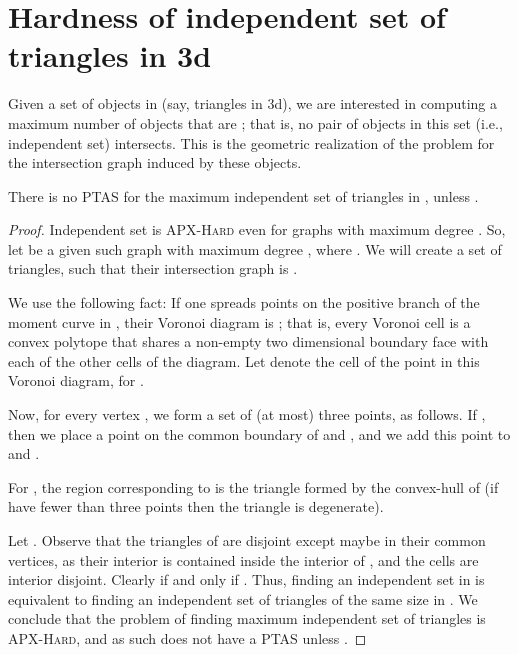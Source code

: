 \documentclass[12pt]{article}
\providecommand{\ComplexityClass}[1]{{{\textcolor[named]{\si{OliveGreen}}{\textsc{#1}}}}}
\providecommand{\APXHard}{{\ComplexityClass{\si{APX}-Hard}}\xspace}
\providecommand{\PTAS}{\textsf{\si{PTAS}}\xspace}
\begin{document}
\section{Hardness of independent set of triangles in 3d}

Given a set  of  objects in  (say, triangles in
3d), we are interested in computing a maximum number of objects that
are ; that is, no pair of objects in this set
(i.e., independent set) intersects. This is the geometric realization
of the  problem for the intersection graph
induced by these objects.


\begin{lemma}
    There is no \PTAS for the maximum independent set of triangles in
    , unless .
\end{lemma}

\begin{proof}
    Independent set is \APXHard even for graphs with maximum degree
     \cite{acgkm-ca-99}. So, let  be a given such
    graph with maximum degree , where . We will create a set of triangles, such that their
    intersection graph is .

    We use the following fact: If one spreads  points
     on the positive branch of the moment curve
    in  \cite{s-eubnf-91, ek-alnfc-03}, their Voronoi diagram
    is ; that is, every Voronoi cell is a convex
    polytope that shares a non-empty two dimensional boundary face
    with each of the other cells of the diagram. Let  denote the
    cell of the point  in this Voronoi diagram, for
    .

    Now, for every vertex , we form a set  of
    (at most) three points, as follows. If , then we
    place a point  on the common boundary of  and ,
    and we add this point to  and .
    
    For , the region  corresponding to  is
    the triangle formed by the convex-hull of  (if
     have fewer than three points then the triangle is
    degenerate).

    Let .  Observe that the triangles
    of  are disjoint except maybe in their common vertices,
    as their interior is contained inside the interior of , and
    the cells  are interior disjoint. Clearly  if and only if . Thus,
    finding an independent set in  is equivalent to finding an
    independent set of triangles of the same size in . We
    conclude that the problem of finding maximum independent set of
    triangles is \APXHard, and as such does not have a \PTAS unless
    .
\end{proof}
\end{document}
